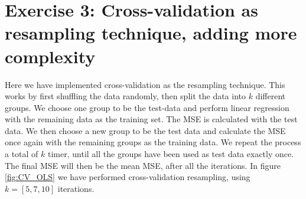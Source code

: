 \documentclass[reprint,english,notitlepage,aps,nobalancelastpage,nofootinbib]{revtex4-1}  %
\begin{document}
\section*{Exercise 3: Cross-validation as resampling technique, adding more complexity}

Here we have implemented cross-validation as the resampling technique. This works by first shuffling the data randomly, then split the data into $k$ different groups. We choose one group to be the test-data and perform linear regression with the remaining data as the training set. The MSE is calculated with the test data. We then choose a new group to be the test data and calculate the MSE once again with the remaining groups as the training data. We repeat the process a total of $k$ timer, until all the groups have been used as test data exactly once. The final MSE will then be the mean MSE, after all the iterations. In figure \ref{fig:CV_OLS} we have performed cross-validation resampling, using $k = [5,7,10]$ iterations.
\end{document}
